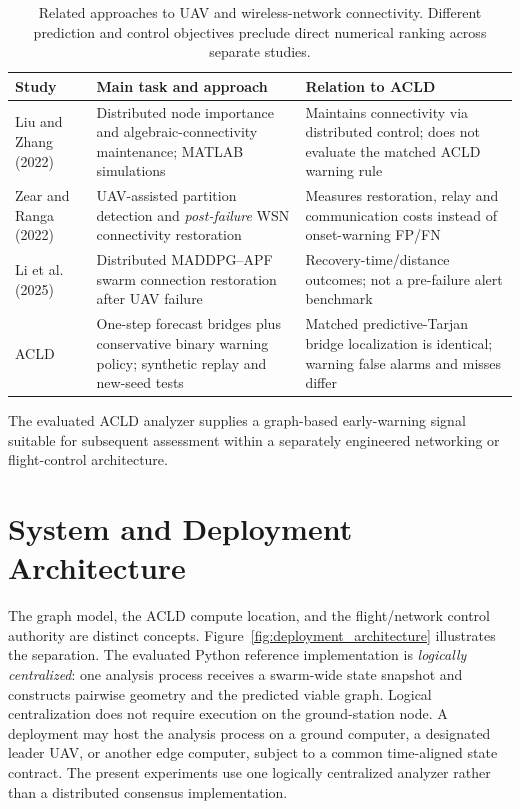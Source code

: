 \documentclass[preprint,12pt]{elsarticle}
\theoremstyle{definition}\newtheorem{definition}{Definition}
\theoremstyle{plain}\newtheorem{theorem}{Theorem}
\theoremstyle{plain}\newtheorem{lemma}{Lemma}
\theoremstyle{plain}\newtheorem{corollary}{Corollary}
\theoremstyle{plain}\newtheorem{assumption}{Assumption}
\theoremstyle{remark}\newtheorem{remark}[theorem]{Remark}
\begin{document}
\begin{table}[htbp]
\centering\footnotesize
\caption{Related approaches to UAV and wireless-network connectivity. Different prediction and control objectives preclude direct numerical ranking across separate studies.}
\label{tab:related_comparison}
\begin{tabularx}{\linewidth}{@{}p{2.25cm}Y Y@{}}\toprule
Study & Main task and approach & Relation to ACLD\\\midrule
Liu and Zhang~\cite{liu2022robust} (2022) & Distributed node importance and algebraic-connectivity maintenance; MATLAB simulations & Maintains connectivity via distributed control; does not evaluate the matched ACLD warning rule\\
Zear and Ranga~\cite{zear2022UAVs} (2022) & UAV-assisted partition detection and \emph{post-failure} WSN connectivity restoration & Measures restoration, relay and communication costs instead of onset-warning FP/FN\\
Li et al.~\cite{li2025fast} (2025) & Distributed MADDPG--APF swarm connection restoration after UAV failure & Recovery-time/distance outcomes; not a pre-failure alert benchmark\\
ACLD & One-step forecast bridges plus conservative binary warning policy; synthetic replay and new-seed tests & Matched predictive-Tarjan bridge localization is identical; warning false alarms and misses differ\\\bottomrule
\end{tabularx}
\end{table}

The evaluated ACLD analyzer supplies a graph-based early-warning signal suitable for subsequent assessment within a separately engineered networking or flight-control architecture.

\section{System and Deployment Architecture}
\label{sec:system_architecture}

The graph model, the ACLD compute location, and the flight/network control authority are distinct concepts. Figure~\ref{fig:deployment_architecture} illustrates the separation. The evaluated Python reference implementation is \emph{logically centralized}: one analysis process receives a swarm-wide state snapshot and constructs pairwise geometry and the predicted viable graph. Logical centralization does not require execution on the ground-station node. A deployment may host the analysis process on a ground computer, a designated leader UAV, or another edge computer, subject to a common time-aligned state contract. The present experiments use one logically centralized analyzer rather than a distributed consensus implementation.
\end{document}

